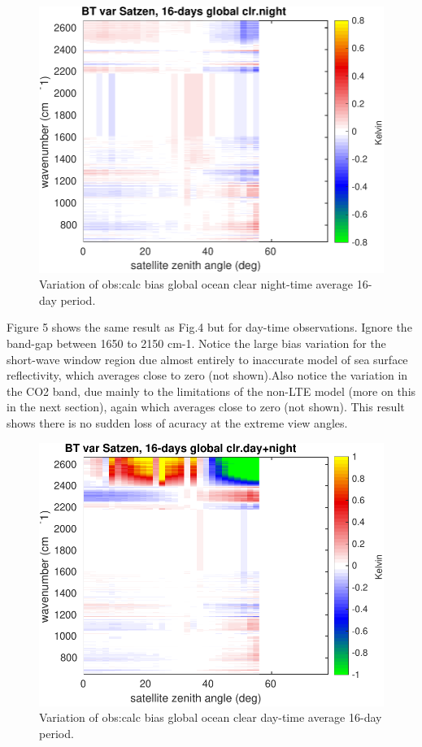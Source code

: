 \documentclass[11pt,twocolumn]{article}
\begin{document}
\begin{figure}[htbp]
\centering
\includegraphics[width=\linewidth]{./Figs/airs_oc_bias_vs_satzen_wvn_16dy_gblclr_nite_pcolor.pdf}
\caption{\label{fig:org5337b0a}Variation of obs:calc bias global ocean clear night-time average 16-day period.}
\end{figure}

Figure 5 shows the same result as Fig.4 but for day-time observations. Ignore the band-gap
between 1650 to 2150 cm-1. Notice the large bias variation for the short-wave window region
due almost entirely to inaccurate model of sea surface reflectivity, which averages
close to zero (not shown).Also notice the variation in the CO2 band, due mainly to the
limitations of the non-LTE model (more on this in the next section), again which
averages close to zero (not shown). This result shows there is no sudden loss of
acuracy at the extreme view angles.

\begin{figure}[htbp]
\centering
\includegraphics[width=\linewidth]{./Figs/airs_oc_bias_vs_satzen_wvn_16dy_gblclr_pcolor.pdf}
\caption{\label{fig:orgc152cf5}Variation of obs:calc bias global ocean clear day-time average 16-day period.}
\end{figure}
\end{document}
